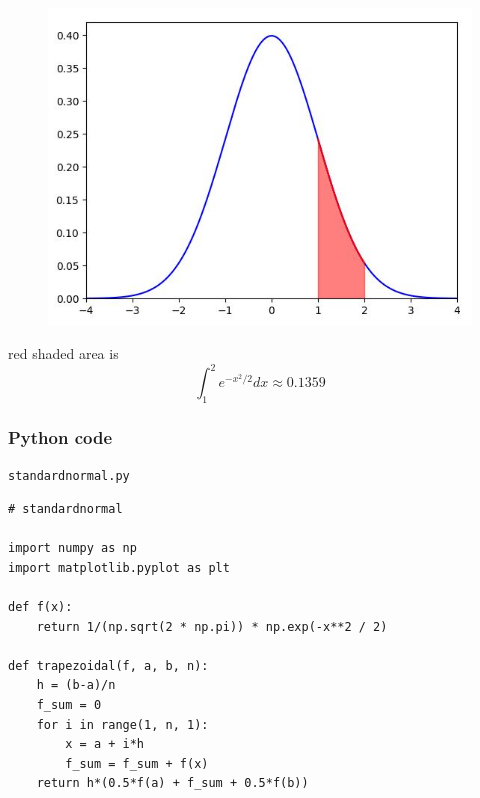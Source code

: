\documentclass[english,14pt]{beamer}
\begin{document}
\begin{frame}[fragile]

\frametitle{}

\begin{figure}[ht]
	\centering
	\includegraphics[width=.7\textwidth]{figures/stdnormal_12}
\end{figure}

red shaded area is
\[
\int_1^2 e^{-x^2/2} dx \approx 0.1359
\]

\end{frame}


\begin{frame}[fragile]

\frametitle{Python code}

\texttt{standardnormal.py}
\begin{lstlisting}[style=CStyle,basicstyle=\scriptsize]
# standardnormal

import numpy as np
import matplotlib.pyplot as plt

def f(x):
    return 1/(np.sqrt(2 * np.pi)) * np.exp(-x**2 / 2)

def trapezoidal(f, a, b, n):
    h = (b-a)/n
    f_sum = 0
    for i in range(1, n, 1):
        x = a + i*h
        f_sum = f_sum + f(x)
    return h*(0.5*f(a) + f_sum + 0.5*f(b))
\end{lstlisting}

\end{frame}

\end{document}

